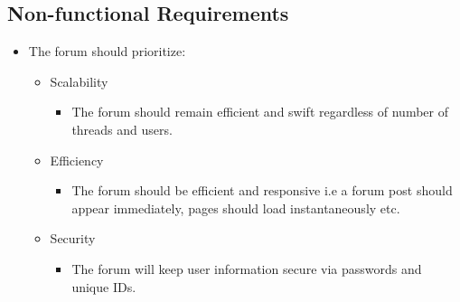 \documentclass[a4paper, 12pt]{article}
\begin{document}
		\subsection{Non-functional Requirements}
			\begin{itemize}
				\item The forum should prioritize:
				\begin{itemize}
					\item Scalability
					\begin{itemize}
						\item The forum should remain efficient and swift regardless of number of threads and users.
					\end{itemize}
					\item Efficiency
					\begin{itemize}
						\item The forum should be efficient and responsive i.e a forum post should appear immediately,
						pages should load instantaneously etc.
					\end{itemize}
					\item Security
					\begin{itemize}
						\item The forum will keep user information secure via passwords and unique IDs.
					\end{itemize}
				\end{itemize}
			\end{itemize}
\end{document}
